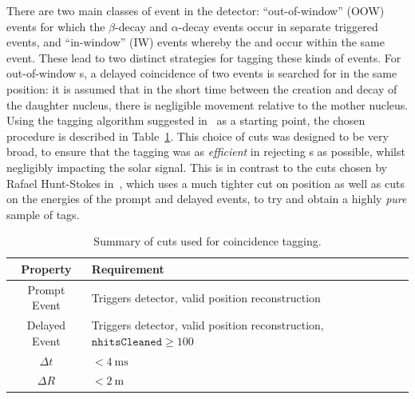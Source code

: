 There are two main classes of  event in the detector: ``out-of-window'' (OOW) events for which the  $\beta$-decay and  $\alpha$-decay events occur in separate triggered events, and ``in-window'' (IW) events whereby the  and  occur within the same event. These lead to two distinct strategies for tagging these kinds of events. For out-of-window s, a delayed coincidence of two events is searched for in the same position: it is assumed that in the short time between the creation and decay of the daughter nucleus, there is negligible movement relative to the mother nucleus. Using the tagging algorithm suggested in~\cite{wilsonBiPoRejectionFactors2017,kroupovaImprovingSensitivityNeutrinoless2020} %
as a starting point, the chosen procedure is described in Table~\ref{tab:bipo_oow_tagging_requirements}. This choice of cuts was designed to be very broad, to ensure that the tagging was as \textit{efficient} in rejecting s as possible, whilst negligibly impacting the solar signal. This is in contrast to the cuts chosen by Rafael Hunt-Stokes in~\cite{hunt-stokesUraniumThoriumBackground2022}, %
which uses a much tighter cut on position as well as cuts on the energies of the prompt and delayed events, to try and obtain a highly \textit{pure} sample of  tags.

\begin{table}
    \centering
    \begin{tabular}{c >{\centering\arraybackslash}m{7.5 cm}}
        \hline
        Property      & Requirement \\ \hline \hline
        Prompt Event  & Triggers detector, valid position reconstruction \\
        Delayed Event & Triggers detector, valid position reconstruction, $\texttt{nhitsCleaned} \geq 100$ \\
        $\Delta t$    & $<\SI{4}{\milli\second}$ \\
        $\Delta R$    & $<\SI{2}{\metre}$ \\
        \hline
    \end{tabular}
    \caption[Summary of cuts used for coincidence tagging]
    {Summary of cuts used for coincidence tagging.}
    \label{tab:bipo_oow_tagging_requirements}
\end{table}

